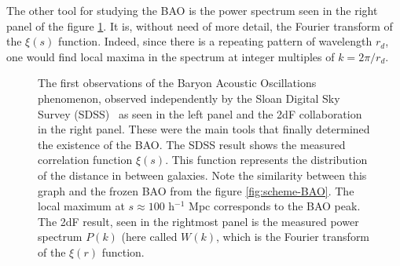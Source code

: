 The other tool for studying the BAO is the power spectrum seen in the right panel of the figure \ref{fig:2005-results}. It is, without need of more detail, the Fourier transform of the $\xi(s)$ function. Indeed, since there is a repeating pattern of wavelength $r_d$, one would find local maxima in the spectrum at integer multiples of $k = 2\pi /r_d$. \\

\begin{figure}[t] \centering
	\hspace{0.2pt}
	\caption{The first observations of the Baryon Acoustic Oscillations phenomenon, observed independently by the Sloan Digital Sky Survey (SDSS)~\cite{Eisenstein2005} as seen in the left panel and the 2dF collaboration~\cite{2dFCole2005} in the right panel. These were the main tools that finally determined the existence of the BAO. The SDSS result shows the measured correlation function $\xi(s)$. This function represents the distribution of the distance in between galaxies. Note the similarity between this graph and the frozen BAO from the figure \ref{fig:scheme-BAO}. The local maximum at $s\approx 100$ h$^{-1}$ Mpc corresponds to the BAO peak. The 2dF result, seen in the rightmost panel is the measured power spectrum $P(k)$ (here called  $W(k)$, which is the Fourier transform of the $\xi(r)$ function.}
	\label{fig:2005-results}
\end{figure}


